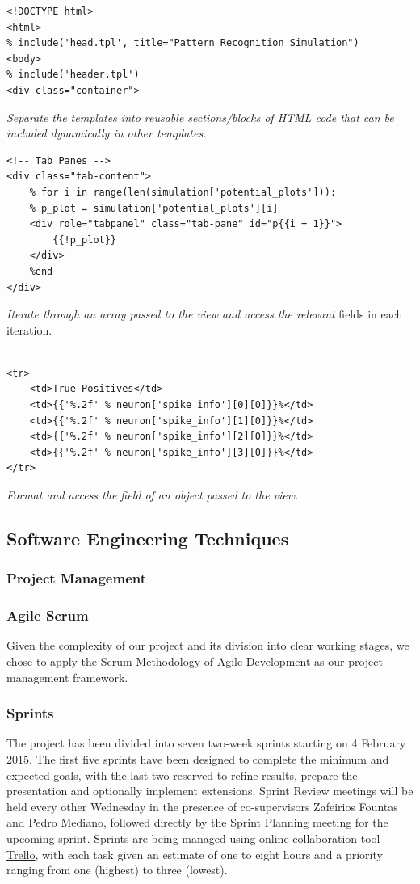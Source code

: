 \documentclass[a4paper,11pt]{article}
\begin{document}
\begin{verbatim}
<!DOCTYPE html>
<html>
% include('head.tpl', title="Pattern Recognition Simulation")
<body>
% include('header.tpl')
<div class="container">
\end{verbatim}
\textit{Separate the templates into reusable sections/blocks of HTML code that can be included dynamically in other templates.}    
\newpage 


\begin{verbatim}
<!-- Tab Panes -->
<div class="tab-content">
    % for i in range(len(simulation['potential_plots'])):
    % p_plot = simulation['potential_plots'][i]
    <div role="tabpanel" class="tab-pane" id="p{{i + 1}}">
        {{!p_plot}}
    </div>
    %end
</div>
\end{verbatim}
\textit{Iterate through an array passed to the view and access the relevant} fields in each iteration.
\\
\\

\begin{verbatim}
<tr>
    <td>True Positives</td>
    <td>{{'%.2f' % neuron['spike_info'][0][0]}}%</td>
    <td>{{'%.2f' % neuron['spike_info'][1][0]}}%</td>
    <td>{{'%.2f' % neuron['spike_info'][2][0]}}%</td>
    <td>{{'%.2f' % neuron['spike_info'][3][0]}}%</td>
</tr>
  \end{verbatim}
\textit{Format and access the field of an object passed to the view.}

\subsection{Software Engineering Techniques}
\subsubsection{Project Management}

\subsubsection{Agile Scrum}

Given the complexity of our project and its division into clear working stages, we chose to apply the Scrum Methodology of Agile Development as our project management framework.

\subsubsection{Sprints}
The project has been divided into seven two-week sprints starting on 4 February 2015. The first five sprints have been designed to complete the minimum and expected goals, with the last two reserved to refine results, prepare the presentation and optionally implement extensions. Sprint Review meetings will be held every other Wednesday in the presence of co-supervisors Zafeirios Fountas and Pedro Mediano, followed directly by the Sprint Planning meeting for the upcoming sprint. Sprints are being managed using online collaboration tool \href{http://trello.com}{Trello}, with each task given an estimate of one to eight hours and a priority ranging from one (highest) to three (lowest).
\end{document}
